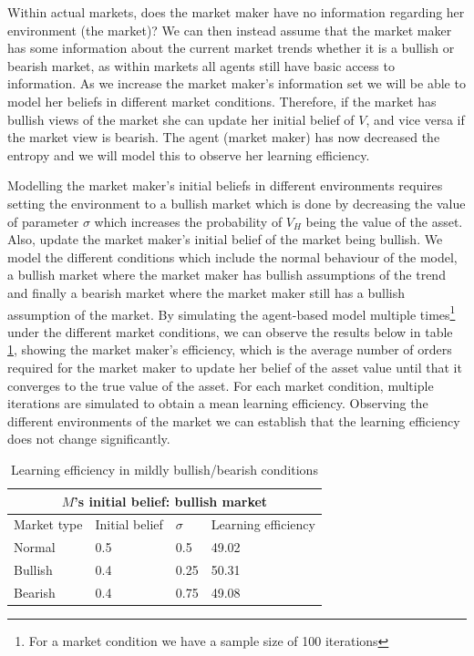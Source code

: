 \documentclass{article}
\begin{document}
Within actual markets, does the market maker have no information regarding her environment (the market)? We can then instead assume that the market maker has some information about the current market trends whether it is a bullish or bearish market, as within markets all agents still have basic access to information. As we increase the market maker's information set we will be able to model her beliefs in different market conditions. Therefore, if the market has bullish views of the market she can update her initial belief of $V$, and vice versa if the market view is bearish. The agent (market maker) has now decreased the entropy and we will model this to observe her learning efficiency.

Modelling the market maker's initial beliefs in different environments requires setting the environment to a bullish market which is done by decreasing the value of parameter $\sigma$ which increases the probability of $V_H$ being the value of the asset. Also, update the market maker's initial belief of the market being bullish. We model the different conditions which include the normal behaviour of the model, a bullish market where the market maker has bullish assumptions of the trend and finally a bearish market where the market maker still has a bullish assumption of the market. By simulating the agent-based model multiple times\footnote{For a market condition we have a sample size of 100 iterations } under the different market conditions, we can observe the results below in table \ref{tlb:normal conditions}, showing the market maker's efficiency, which is the average number of orders required for the market maker to update her belief of the asset value until that it converges to the true value of the asset. For each market condition, multiple iterations are simulated to obtain a mean learning efficiency. Observing the different environments of the market we can establish that the learning efficiency does not change significantly. 

\begin{table}[ht]
    \centering
    \begin{tabular}{ |p{3cm}||p{3cm}|p{3cm}|p{3cm}|  }
        \hline
        \multicolumn{4}{|c|}{$M$'s initial belief: bullish market} \\
        \hline
        Market type& Initial belief & $\sigma$ & Learning efficiency\\
        \hline
        Normal & 0.5 & 0.5 & 49.02\\
        Bullish& 0.4 & 0.25& 50.31\\
        Bearish& 0.4 & 0.75& 49.08\\
        \hline
       \end{tabular}
       \caption{Learning efficiency in mildly bullish/bearish conditions}
       \label{tlb:normal conditions}
\end{table}
\end{document}
